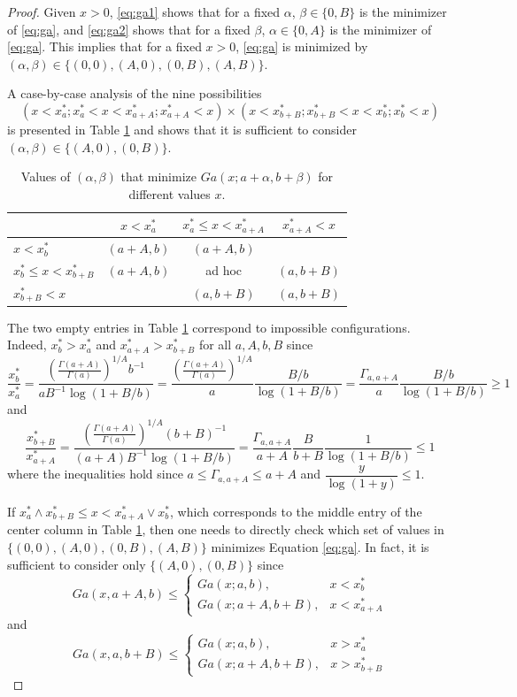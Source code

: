 \documentclass[11pt]{article}
\begin{document}
	\begin{proof}
		Given $x>0$, \ref{eq:ga1} shows that for a fixed $\alpha$, $\beta \in \{0, B\}$ is the minimizer of \ref{eq:ga}, and \ref{eq:ga2} shows that for a fixed $\beta$, $\alpha \in \{0, A\}$ is the minimizer of \ref{eq:ga}. This implies that for a fixed $x>0$, \ref{eq:ga} is minimized by $(\alpha, \beta) \in \{(0,0), (A, 0), (0, B), (A,B)\}$.
		
		A case-by-case analysis of the nine possibilities
		$$(x<x_a^*; x_a^*<x<x_{a+A}^*; x_{a+A}^* < x )\times(x<x_{b+B}^*; x_{b+B}^*<x<x_b^*; x_b^* < x)$$
		is presented in Table \ref{tab:ga9} and shows that it is sufficient to consider $(\alpha, \beta) \in \{(A, 0), (0, B)\}$.
		
		\begin{table}[H]
			\centering
			\begin{tabular}{l|c c c}
				& $x<x_a^*$  & $x_a^*\le x<x_{a+A}^*$ & $x_{a+A}^* < x$ \\ \hline
				$x<x_b^*$              & $(a+A, b)$ & $(a+A, b)$             &                 \\
				$x_b^*\le x<x_{b+B}^*$ & $(a+A, b)$ &  ad hoc                & $(a, b+B)$      \\
				$x_{b+B}^* < x$        &            & $(a, b+B)$             & $(a, b+B)$
			\end{tabular}
			\caption{Values of $(\alpha, \beta)$ that minimize $Ga(x;a+\alpha,b+\beta)$ for different values $x$.}
			\label{tab:ga9}
		\end{table}
		
		The two empty entries in Table \ref{tab:ga9} correspond to impossible configurations. Indeed, $x_b^* > x_a^*$ and $x_{a+A}^* > x_{b+B}^*$ for all $a, A, b, B$ since
		$$
		\frac{x_b^*}{x_a^*} = \dfrac{\left(\frac{\Gamma(a+A)}{\Gamma(a)}\right)^{1/A} b^{-1} }{a B^{-1} \log\left( 1+B/b\right)} = \dfrac{\left(\frac{\Gamma(a+A)}{\Gamma(a)}\right)^{1/A}}{a} \dfrac{B/b}{\log\left( 1+B/b\right)} = \dfrac{\Gamma_{a,a+A}}{a} \dfrac{B/b}{\log\left( 1+B/b\right)} \ge 1
		$$
		and
		$$
		\frac{x_{b+B}^*}{x_{a+A}^*} = \dfrac{\left(\frac{\Gamma(a+A)}{\Gamma(a)}\right)^{1/A} (b+B)^{-1} }{(a+A) B^{-1} \log\left( 1+B/b\right)} = \dfrac{\Gamma_{a,a+A}}{a+A} \dfrac{B}{b+B} \dfrac{1}{\log\left( 1+B/b\right)} \le 1
		$$
		where the inequalities hold since $a \le \Gamma_{a,a+A} \le a+A$ and $\dfrac{y}{\log\left( 1+y\right)}\le1$.
		
		If $x_a^* \wedge x_{b+B}^*\le x < x_{a+A}^* \vee x_{b}^*$, which corresponds to the middle entry of the center column in Table \ref{tab:ga9}, then one needs to directly check which set of values in $\{(0,0), (A, 0), (0, B), (A,B)\}$ minimizes Equation \ref{eq:ga}. In fact, it is sufficient to consider only $\{(A,0), (0, B)\}$ since
		$$Ga(x, a+A, b) \le \begin{cases}
			Ga(x;a,b), & x < x_b^* \\
			Ga(x;a+A,b+B), & x < x_{a+A}^* 
		\end{cases}$$
		and
		$$Ga(x, a, b+B) \le \begin{cases}
			Ga(x;a,b), & x > x_a^* \\
			Ga(x;a+A,b+B), & x > x_{b+B}^* 
		\end{cases}$$
	\end{proof}
	
\end{document}
